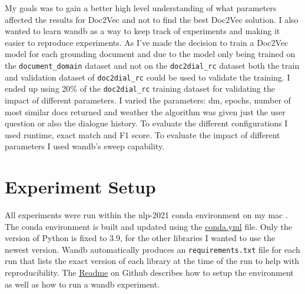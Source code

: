 \documentclass[11pt]{article}
\begin{document}
    My goals was to gain a better high level understanding of what parameters affected the results for Doc2Vec and not to
    find the best Doc2Vec solution. I also wanted to learn wandb as a way to keep track of experiments and making it easier
    to reproduce experiments. As I've made the decision to train a Doc2Vec model for each grounding document and
    due to the model only being trained on the \texttt{document\_domain} dataset and not on the
    \texttt{doc2dial\_rc} dataset both the train and validation dataset of \texttt{doc2dial\_rc} could be used to validate
    the training. I ended up using 20\% of the \texttt{doc2dial\_rc} training dataset for validating the
    impact of different parameters. I varied the parameters: dm, epochs, number of most similar docs returned and weather
    the algorithm was given just the user question or also the dialogue history. To evaluate the different configurations
    I used runtime, exact match and F1 score. To evaluate the impact of different parameters I used wandb's sweep capability.


    \section{Experiment Setup}\label{sec:experiment-setup}

    All experiments were run within the nlp-2021 conda environment on my mac \cite{conda_forge_community_2015_4774216}.
    The conda environment is built and updated using the
    \href{https://github.com/isabelladegen/nlp-2021/blob/main/conda.yml}{conda.yml} file. Only the version of Python is
    fixed to 3.9, for the other libraries I wanted to use the newest version. Wandb \cite{wandb} automatically produces
    an \texttt{requirements.txt}
    file for each run that lists the exact version of each library at the time of the run to help with reproducibility. The
    \href{https://github.com/isabelladegen/nlp-2021}{Readme} on Github describes how to setup the environment as well
    as how to run a wandb experiment.
\end{document}
